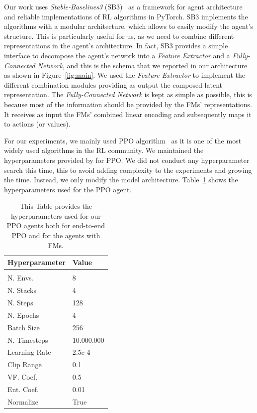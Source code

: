 Our work uses \textit{Stable-Baselines3} (SB3)~\citep{stable-baselines3} as a framework for agent architecture and reliable implementations of RL algorithms in PyTorch.
SB3 implements the algorithms with a modular architecture, which allows to easily modify the agent's structure.
This is particularly useful for us, as we need to combine different representations in the agent's architecture.
In fact, SB3 provides a simple interface to decompose the agent's network into a \textit{Feature Extractor} and a \textit{Fully-Connected Network}, and this is the schema that we reported in our architecture as shown in Figure~\ref{fig:main}.
We used the \textit{Feature Extractor} to implement the different combination modules providing as output the composed latent representation.
The \textit{Fully-Connected Network} is kept as simple as possible, this is because most of the information should be provided by the FMs' representations.
It receives as input the FMs' combined linear encoding and subsequently maps it to actions (or values).

For our experiments, we mainly used PPO algorithm~\citep{schulman2017proximal} as it is one of the most widely used algorithms in the RL community.
We maintained the hyperparameters provided by \citet{rl-zoo3} for PPO.
We did not conduct any hyperparameter search this time, this to avoid adding complexity to the experiments and growing the time.
Instead, we only modify the model architecture.
Table~\ref{tab:ppo_hyperparams} shows the hyperparameters used for the PPO agent.

\begin{table}[htbp]
    \centering
        \begin{tabular}{ll}
            \multicolumn{1}{l}{\textbf{Hyperparameter}}  &\multicolumn{1}{l}{\textbf{Value}}
            \\ \hline \\
            N. Envs.       & 8 \\
            N. Stacks      & 4 \\
            N. Steps       & 128 \\
            N. Epochs      & 4 \\
            Batch Size     & 256 \\
            N. Timesteps   & 10.000.000 \\
            Learning Rate  & 2.5e-4 \\
            Clip Range     & 0.1 \\
            VF. Coef.      & 0.5 \\
            Ent. Coef.     & 0.01 \\
            Normalize      & True \\
        \end{tabular}
        \caption{This Table provides the hyperparameters used for our PPO agents both for end-to-end PPO and for the agents with FMs.}
    \label{tab:ppo_hyperparams}
\end{table}

